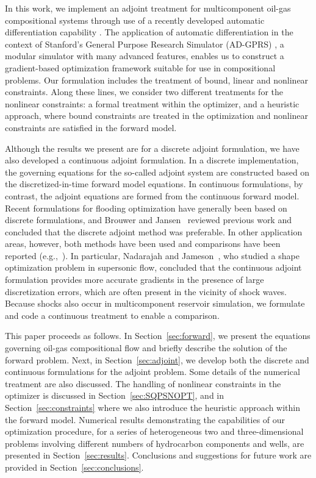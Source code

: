 \documentclass[twocolumn,numbook]{svjour3}          %
\begin{document}
In this work, we implement an adjoint treatment for multicomponent oil-gas
compositional systems through use of a recently developed automatic
differentiation capability \cite{Younis:2010}. The application of automatic
differentiation in the context of Stanford's General Purpose Research Simulator
(AD-GPRS) \cite{Cao:Thesis}, a modular simulator with many advanced features,
enables us to construct a gradient-based optimization framework suitable for
use in compositional problems. Our formulation includes the treatment of
bound, linear and nonlinear constraints. Along these lines, we consider two
different treatments for the nonlinear constraints: a formal treatment within
the optimizer, and a heuristic approach, where bound constraints are treated
 in the optimization and nonlinear constraints are satisfied in the forward model.


Although the results we present are for a discrete adjoint formulation,
we have also developed a continuous adjoint formulation. In a discrete
implementation, the governing equations for the so-called adjoint
system are constructed based on the discretized-in-time forward model
equations. In continuous formulations, by contrast, the adjoint
equations are formed from the continuous forward model. Recent
formulations for flooding optimization have generally been based on
discrete formulations, and Brouwer and Jansen~\cite{Brouwer:2004}
reviewed previous work and concluded that the discrete adjoint method
was preferable. In other application areas, however, both methods have
been used and comparisons have been reported
(e.g.,~\cite{Jameson:2007,Asouti:2008}). In particular, Nadarajah and
Jameson~\cite{Jameson:2007}, who studied a shape optimization problem
in supersonic flow, concluded that the continuous adjoint formulation
provides more accurate gradients in the presence of large
discretization errors, which are often present in the vicinity of shock
waves. Because shocks also occur in multicomponent reservoir simulation, we
formulate and code a continuous treatment to enable a comparison.

This paper proceeds as follows. In Section~\ref{sec:forward}, we present the
equations governing oil-gas compositional flow and briefly describe the solution
of the forward problem. Next, in Section~\ref{sec:adjoint}, we develop both the
discrete and continuous formulations for the adjoint problem. Some details of
the numerical treatment are also discussed. The handling of nonlinear
constraints in the optimizer is discussed in Section~\ref{sec:SQPSNOPT}, 
and in Section~\ref{sec:constraints} where we also introduce the heuristic approach within the forward
model. Numerical results
demonstrating the capabilities of our optimization procedure, for a series of
heterogeneous two and three-dimensional problems involving different numbers of
hydrocarbon components and wells, are presented in Section~\ref{sec:results}.
Conclusions and suggestions for future work are provided in
Section~\ref{sec:conclusions}.
\end{document}
